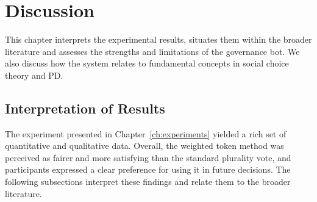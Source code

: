 \doublespacing %

\chapter{Discussion}
\label{ch:discussion}

\begin{spacing}{1} %
\minitoc %
\end{spacing} %
\thesisspacing %


This chapter interprets the experimental results, situates them within the
broader literature and assesses the strengths and limitations of the
governance bot.  We also discuss how the system relates to fundamental
concepts in social choice theory and PD.

\section{Interpretation of Results}

The experiment presented in Chapter~\ref{ch:experiments} yielded a rich set of quantitative and qualitative data.  Overall, the weighted token method was perceived as fairer and more satisfying than the standard plurality vote, and participants expressed a clear preference for using it in future decisions.  The following subsections interpret these findings and relate them to the broader literature.

